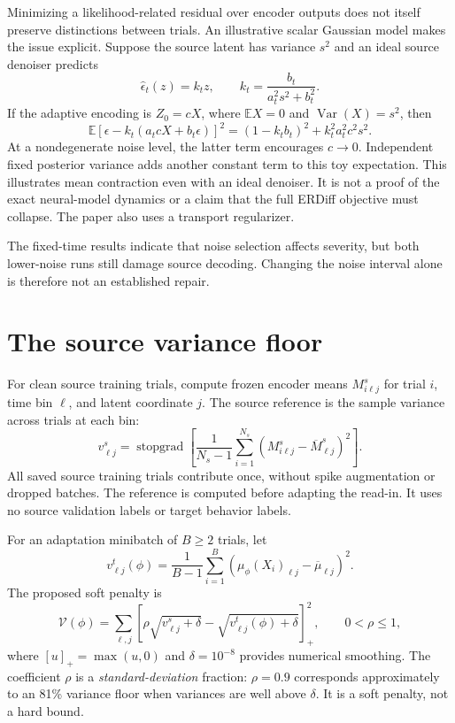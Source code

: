 \documentclass[11pt,a4paper]{article}
\DeclareMathOperator{\Var}{Var}
\newcommand{\E}{\mathbb{E}}
\newcommand{\pos}[1]{\left[#1\right]_{+}}
\newcommand{\stopgrad}{\operatorname{stopgrad}}
\begin{document}
Minimizing a likelihood-related residual over encoder outputs does not itself
preserve distinctions between trials. An illustrative scalar Gaussian model
makes the issue explicit. Suppose the source latent has variance $s^2$ and an
ideal source denoiser predicts
\begin{equation}
 \widehat\epsilon_t(z)=k_tz,
 \qquad k_t=\frac{b_t}{a_t^2s^2+b_t^2}.
\end{equation}
If the adaptive encoding is $Z_0=cX$, where $\E X=0$ and $\Var(X)=s^2$, then
\begin{equation}
 \E\left[\epsilon-k_t(a_tcX+b_t\epsilon)\right]^2
 =(1-k_tb_t)^2+k_t^2a_t^2c^2s^2.
\end{equation}
At a nondegenerate noise level, the latter term encourages $c\to0$. Independent
fixed posterior variance adds another constant term to this toy expectation.
This illustrates mean contraction even with an ideal denoiser. It is not a
proof of the exact neural-model dynamics or a claim that the full ERDiff
objective must collapse. The paper also uses a transport regularizer.

The fixed-time results indicate that noise selection affects severity, but
both lower-noise runs still damage source decoding. Changing the noise interval
alone is therefore not an established repair.

\section{The source variance floor}

For clean source training trials, compute frozen encoder means
$M^{s}_{i\ell j}$ for trial $i$, time bin $\ell$, and latent coordinate $j$.
The source reference is the sample variance across trials at each bin:
\begin{equation}
 v^{s}_{\ell j}=\stopgrad\!\left[
 \frac{1}{N_s-1}\sum_{i=1}^{N_s}
 (M^s_{i\ell j}-\overline M^s_{\ell j})^2\right].
 \label{eq:sourcevariance}
\end{equation}
All saved source training trials contribute once, without spike augmentation
or dropped batches. The reference is computed before adapting the read-in.
It uses no source validation labels or target behavior labels.

For an adaptation minibatch of $B\ge2$ trials, let
\begin{equation}
 v^{t}_{\ell j}(\phi)=\frac{1}{B-1}\sum_{i=1}^{B}
 \left(\mu_\phi(X_i)_{\ell j}-\overline\mu_{\ell j}\right)^2.
\end{equation}
The proposed soft penalty is
\begin{equation}
 \boxed{\displaystyle
 \mathcal V(\phi)=\sum_{\ell,j}
 \pos{\rho\sqrt{v^{s}_{\ell j}+\delta}
              -\sqrt{v^{t}_{\ell j}(\phi)+\delta}}^2,}
 \qquad 0<\rho\le1,
 \label{eq:floor}
\end{equation}
where $[u]_+=\max(u,0)$ and $\delta=10^{-8}$ provides numerical smoothing.
The coefficient $\rho$ is a \emph{standard-deviation} fraction: $\rho=0.9$
corresponds approximately to an 81\% variance floor when variances are well
above $\delta$. It is a soft penalty, not a hard bound.
\end{document}
